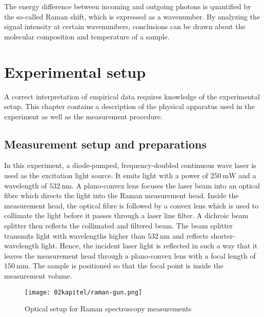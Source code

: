 The energy difference between incoming and outgoing photons is quantified by the so-called Raman shift, which is expressed as a wavenumber. By analyzing the signal intensity at certain wavenumbers, conclusions can be drawn about the molecular composition and temperature of a sample.

\chapter{Experimental setup}
\label{chap:experimental}

A correct interpretation of empirical data requires knowledge of the experimental setup. This chapter contains a description of the physical apparatus used in the experiment as well as the measurement procedure.

\section{Measurement setup and preparations}

In this experiment, a diode-pumped, frequency-doubled continuous wave laser is used as the excitation light source. It emits light with a power of $250~\mathrm{mW}$ and a wavelength of $532~\mathrm{nm}$. A plano-convex lens focuses the laser beam into an optical fibre which directs the light into the Raman measurement head. Inside the measurement head, the optical fibre is followed by a convex lens which is used to collimate the light before it passes through a laser line filter. A dichroic beam splitter then reflects the collimated and filtered beam. The beam splitter transmits light with wavelengths higher than $532~\mathrm{nm}$ and reflects shorter-wavelength light. Hence, the incident laser light is reflected in such a way that it leaves the measurement head through a plano-convex lens with a focal length of $150~\mathrm{mm}$. The sample is positioned so that the focal point is inside the measurement volume.

\begin{figure}[!htb]
    \centering
    \texttt{[image: 02kapitel/raman-gun.png]}
    \caption[Optical setup for Raman spectroscopy measurements]{Optical setup for Raman spectroscopy measurements \autocite{brauerApplicationRamanSpectroscopy2022}}
    \label{fig:raman-gun}
\end{figure}


